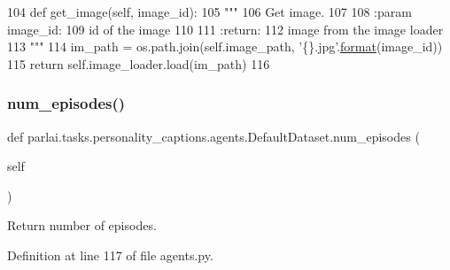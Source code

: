 \begin{DoxyCode}
104     \textcolor{keyword}{def }get\_image(self, image\_id):
105         \textcolor{stringliteral}{"""}
106 \textcolor{stringliteral}{        Get image.}
107 \textcolor{stringliteral}{}
108 \textcolor{stringliteral}{        :param image\_id:}
109 \textcolor{stringliteral}{            id of the image}
110 \textcolor{stringliteral}{}
111 \textcolor{stringliteral}{        :return:}
112 \textcolor{stringliteral}{            image from the image loader}
113 \textcolor{stringliteral}{        """}
114         im\_path = os.path.join(self.image\_path, \textcolor{stringliteral}{'\{\}.jpg'}.\hyperlink{namespaceparlai_1_1chat__service_1_1services_1_1messenger_1_1shared__utils_a32e2e2022b824fbaf80c747160b52a76}{format}(image\_id))
115         \textcolor{keywordflow}{return} self.image\_loader.load(im\_path)
116 
\end{DoxyCode}
\mbox{\label{classparlai_1_1tasks_1_1personality__captions_1_1agents_1_1DefaultDataset_a09fb1bf7bf9dc5ab00ef9f32388336ea}} 
\subsubsection{\texorpdfstring{num\+\_\+episodes()}{num\_episodes()}}
{\footnotesize\ttfamily def parlai.\+tasks.\+personality\+\_\+captions.\+agents.\+Default\+Dataset.\+num\+\_\+episodes (\begin{DoxyParamCaption}\item[{}]{self }\end{DoxyParamCaption})}

\begin{DoxyVerb}Return number of episodes.
\end{DoxyVerb}
 

Definition at line 117 of file agents.\+py.


